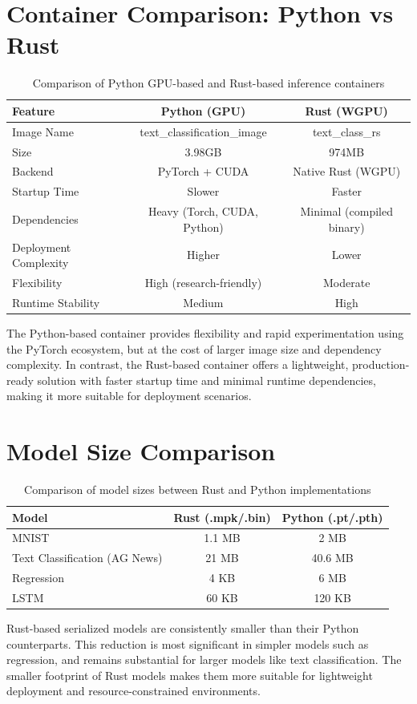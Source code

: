 \documentclass[12pt]{article}
\begin{document}
\newpage

\section{Container Comparison: Python vs Rust}

\begin{table}[h]
\centering
\begin{tabular}{|l|c|c|}
\hline
\textbf{Feature} & \textbf{Python (GPU)} & \textbf{Rust (WGPU)} \\
\hline
Image Name & text\_classification\_image & text\_class\_rs \\
\hline
Size &  3.98GB &  974MB \\
\hline
Backend & PyTorch + CUDA & Native Rust (WGPU) \\
\hline
Startup Time & Slower & Faster \\
\hline
Dependencies & Heavy (Torch, CUDA, Python) & Minimal (compiled binary) \\
\hline
Deployment Complexity & Higher & Lower \\
\hline
Flexibility & High (research-friendly) & Moderate \\
\hline
Runtime Stability & Medium & High \\
\hline
\end{tabular}
\caption{Comparison of Python GPU-based and Rust-based inference containers}
\end{table}

\noindent
The Python-based container provides flexibility and rapid experimentation using the PyTorch ecosystem, but at the cost of larger image size and dependency complexity. In contrast, the Rust-based container offers a lightweight, production-ready solution with faster startup time and minimal runtime dependencies, making it more suitable for deployment scenarios.


\section{Model Size Comparison}

\begin{table}[h]
\centering
\begin{tabular}{|l|c|c|}
\hline
\textbf{Model} & \textbf{Rust (.mpk/.bin)} & \textbf{Python (.pt/.pth)} \\
\hline
MNIST & 1.1 MB & 2 MB \\
\hline
Text Classification (AG News) & 21 MB & 40.6 MB \\
\hline
Regression & 4 KB & 6 MB \\
\hline
LSTM & 60 KB & 120 KB \\
\hline
\end{tabular}
\caption{Comparison of model sizes between Rust and Python implementations}
\end{table}

\noindent
Rust-based serialized models are consistently smaller than their Python counterparts. This reduction is most significant in simpler models such as regression, and remains substantial for larger models like text classification. The smaller footprint of Rust models makes them more suitable for lightweight deployment and resource-constrained environments.
\end{document}
